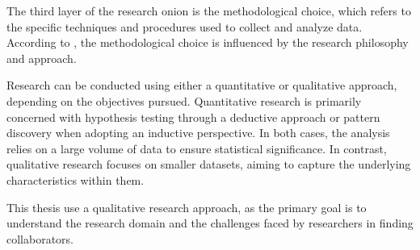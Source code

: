 The third layer of the research onion is the methodological choice, which refers to the specific techniques and procedures used to collect and analyze data.
According to \textcite{SaundersMark2023}, the methodological choice is influenced by the research philosophy and approach.

Research can be conducted using either a quantitative or qualitative approach, depending on the objectives pursued.
Quantitative research is primarily concerned with hypothesis testing through a deductive approach or pattern discovery when adopting an inductive perspective.
In both cases, the analysis relies on a large volume of data to ensure statistical significance.
In contrast, qualitative research focuses on smaller datasets, aiming to capture the underlying characteristics within them.

This thesis use a qualitative research approach, as the primary goal is to understand the research domain and the challenges faced by researchers in finding collaborators.